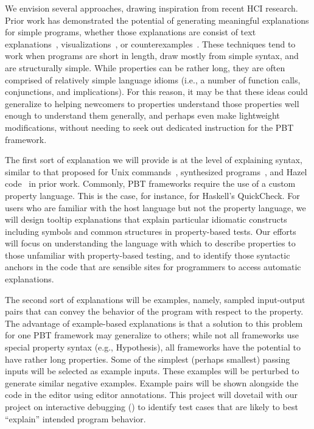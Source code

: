 We envision several approaches, drawing inspiration from recent HCI research.
Prior work has demonstrated the potential of generating meaningful explanations
for simple programs, whether those explanations are consist of text
explanations~\cite{ref:head2015tutorons,ref:mayer2015user},
visualizations~\cite{ref:guo2013online}, or
counterexamples~\cite{ref:dantoni2015can}. These techniques tend to work when
programs are short in length, draw mostly from simple syntax, and are
structurally simple.  While properties can be rather long, they are often
comprised of relatively simple language idioms (i.e., a number of function
calls, conjunctions, and implications). For this reason, it may be that these
ideas could generalize to helping newcomers to properties understand those
properties well enough to understand them generally, and perhaps even make
lightweight modifications, without needing to seek out dedicated instruction for
the PBT framework.

The first sort of explanation we will provide is at the level of explaining
syntax, similar to that proposed for Unix commands~\cite{ref:head2015tutorons},
synthesized programs~\cite{ref:mayer2015user}, and Hazel
code~\cite{ref:potter2022contextualized} in prior work. Commonly, PBT frameworks
require the use of a custom property language. This is the case, for instance,
for Haskell's QuickCheck. For users who are familiar with the host language but
not the property language, we will design tooltip explanations that explain
particular idiomatic constructs including symbols and common structures in
property-based tests. Our efforts will focus on understanding the language with
which to describe properties to those unfamiliar with property-based testing,
and to identify those syntactic anchors in the code that are sensible sites for
programmers to access automatic explanations.

The second sort of explanations will be examples, namely, sampled input-output
pairs that can convey the behavior of the program with respect to the property.
The advantage of example-based explanations is that a solution to this problem
for one PBT framework may generalize to others; while not all frameworks use
special property syntax (e.g., Hypothesis), all frameworks have the potential to
have rather long properties. Some of the simplest (perhaps smallest) passing
inputs will be selected as example inputs. These examples will be perturbed to
generate similar negative examples. Example pairs will be shown alongside the
code in the editor using editor annotations. This project will dovetail with our
project on interactive debugging () to identify
test cases that are likely to best ``explain'' intended program behavior.

